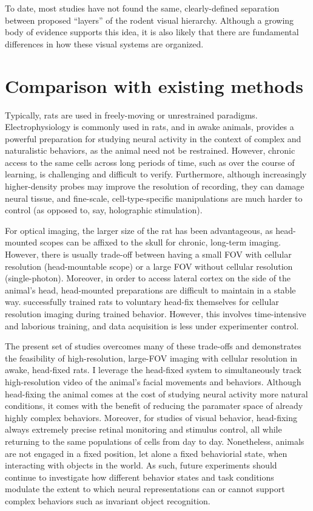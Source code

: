 To date, most studies have not found the same, clearly-defined separation between proposed ``layers'' of the rodent visual hierarchy. Although a growing body of evidence supports this idea, it is also likely that there are fundamental differences in how these visual systems are organized. 

\section{Comparison with existing methods}
Typically, rats are used in freely-moving or unrestrained paradigms. Electrophysiology is commonly used in rats, and in awake animals, provides a powerful preparation for studying neural activity in the context of complex and naturalistic behaviors, as the animal need not be restrained. However, chronic access to the same cells across long periods of time, such as over the course of learning, is challenging and difficult to verify. Furthermore, although increasingly higher-density probes may improve the resolution of recording, they can damage neural tissue, and fine-scale, cell-type-specific manipulations are much harder to control (as opposed to, say, holographic stimulation).  

For optical imaging, the larger size of the rat has been advantageous, as head-mounted scopes can be affixed to the skull for chronic, long-term imaging. However, there is usually trade-off between having a small FOV with cellular resolution (head-mountable scope) or a large FOV without cellular resolution (single-photon). Moreover, in order to access lateral cortex on the side of the animal’s head, head-mounted preparations are difficult to maintain in a stable way. \citet{Scott2013} successfully trained rats to voluntary head-fix themselves for cellular resolution imaging during trained behavior. However, this involves time-intensive and laborious training, and data acquisition is less under experimenter control. 

The present set of studies overcomes many of these trade-offs and demonstrates the feasibility of high-resolution, large-FOV imaging with cellular resolution in awake, head-fixed rats. I leverage the head-fixed system to simultaneously track high-resolution video of the animal’s facial movements and behaviors. Although head-fixing the animal comes at the cost of studying neural activity more natural conditions, it comes with the benefit of reducing the paramater space of already highly complex behaviors. Moreover, for studies of visual behavior, head-fixing always extremely precise retinal monitoring and stimulus control, all while returning to the same populations of cells from day to day. Nonetheless, animals are not engaged in a fixed position, let alone a fixed behaviorial state, when interacting with objects in the world. As such, future experiments should continue to investigate how different behavior states and task conditions modulate the extent to which neural representations can or cannot support complex behaviors such as invariant object recognition.

